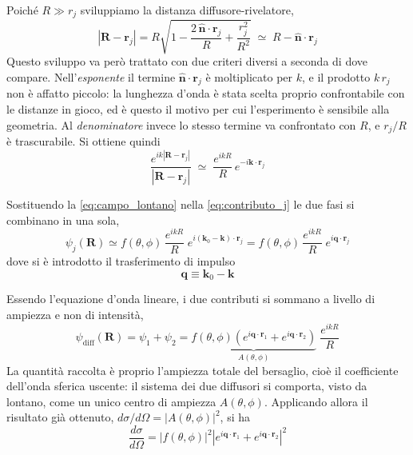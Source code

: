 Poiché $R \gg r_j$ sviluppiamo la distanza diffusore-rivelatore,
%
\begin{equation*}
    \left|\mathbf{R}-\mathbf{r}_j\right| = R\sqrt{1 - \frac{2\,\hat{\mathbf{n}}\cdot\mathbf{r}_j}{R} + \frac{r_j^2}{R^2}} \;\simeq\; R - \hat{\mathbf{n}}\cdot\mathbf{r}_j
\end{equation*}
Questo sviluppo va però trattato con due criteri diversi a seconda di dove compare. Nell'\emph{esponente} il termine $\hat{\mathbf{n}}\cdot\mathbf{r}_j$ è moltiplicato per $k$, e il prodotto $k\,r_j$ non è affatto piccolo: la lunghezza d'onda è stata scelta proprio confrontabile con le distanze in gioco, ed è questo il motivo per cui l'esperimento è sensibile alla geometria. Al \emph{denominatore} invece lo stesso termine va confrontato con $R$, e $r_j/R$ è trascurabile. Si ottiene quindi
%
\begin{equation}
    \frac{e^{ik\left|\mathbf{R}-\mathbf{r}_j\right|}}{\left|\mathbf{R}-\mathbf{r}_j\right|} \;\simeq\; \frac{e^{ikR}}{R}\,e^{-i\mathbf{k}\cdot\mathbf{r}_j}
    \label{eq:campo_lontano}
\end{equation}

Sostituendo la \eqref{eq:campo_lontano} nella \eqref{eq:contributo_j} le due fasi si combinano in una sola,
\begin{equation}
    \psi_j(\mathbf{R}) \simeq f(\theta,\phi)\,\frac{e^{ikR}}{R}\;e^{i\left(\mathbf{k}_0-\mathbf{k}\right)\cdot\mathbf{r}_j} = f(\theta,\phi)\,\frac{e^{ikR}}{R}\;e^{i\mathbf{q}\cdot\mathbf{r}_j}
    \label{eq:contributo_finale}
\end{equation}
dove si è introdotto il trasferimento di impulso
\begin{equation}
    \mathbf{q} \equiv \mathbf{k}_0 - \mathbf{k}
    \label{eq:q_def}
\end{equation}

Essendo l'equazione d'onda lineare, i due contributi si sommano a livello di ampiezza e non di intensità,
\begin{equation}
    \psi_{\text{diff}}(\mathbf{R}) = \psi_1 + \psi_2 = \underbrace{f(\theta,\phi)\left(e^{i\mathbf{q}\cdot\mathbf{r}_1} + e^{i\mathbf{q}\cdot\mathbf{r}_2}\right)}_{\textstyle A(\theta,\phi)}\;\frac{e^{ikR}}{R}
    \label{eq:sovrapposizione}
\end{equation}
La quantità raccolta è proprio l'ampiezza totale del bersaglio, cioè il coefficiente dell'onda sferica uscente: il sistema dei due diffusori si comporta, visto da lontano, come un unico centro di ampiezza $A(\theta,\phi)$. Applicando allora il risultato già ottenuto, $d\sigma/d\Omega = |A(\theta,\phi)|^2$, si ha
\begin{equation}
    \frac{d\sigma}{d\Omega} = \left|f(\theta,\phi)\right|^2 \left|e^{i\mathbf{q}\cdot\mathbf{r}_1} + e^{i\mathbf{q}\cdot\mathbf{r}_2}\right|^2
    \label{eq:sezione_due}
\end{equation}

